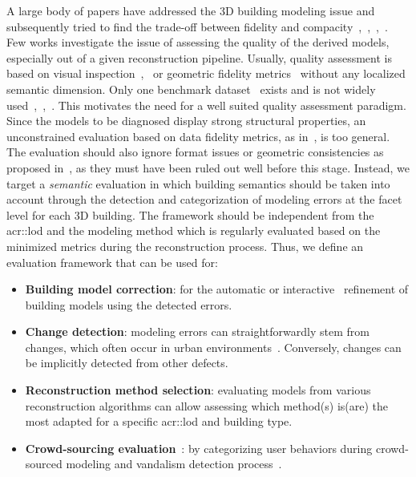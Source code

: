\documentclass[runningheads]{llncs}
\begin{document}
A large body of papers have addressed the 3D building modeling issue and subsequently tried to find the trade-off between fidelity and compacity~\cite{dick2004modelling},~\cite{zebedin2008fusion},~\cite{Lafarge2010},~\cite{verdie2015lod}. Few works investigate the issue of assessing the quality of the derived models, especially out of a given reconstruction pipeline. Usually, quality assessment is based on visual inspection~\cite{Durupt2006},~\cite{MacayMoreia2013} or geometric fidelity metrics~\cite{Kaartinen2005} without any localized semantic dimension. Only one benchmark dataset~\cite{rottensteiner2014results} exists and is not widely used~\cite{li2016boxfitting},~\cite{nan2017polyfit},~\cite{nguatem2017modeling}. This motivates the need for a well suited quality assessment paradigm. Since the models to be diagnosed display strong structural properties, an unconstrained evaluation based on data fidelity metrics, as in~\cite{berger2013benchmark}, is too general. The evaluation should also ignore format issues or geometric consistencies as proposed in~\cite{ledoux2018val3dity}, as they must have been ruled out well before this stage. Instead, we target a \textit{semantic} evaluation in which building semantics should be taken into account through the detection and categorization of modeling errors at the facet level for each 3D building. The framework should be independent from the \acrlong{acr::lod} and the modeling method which is regularly evaluated based on the minimized metrics during the reconstruction process. Thus, we define an evaluation framework that can be used for:
    \begin{itemize}
        \item \textbf{Building model correction}: for the automatic or interactive~\cite{kowdle2011active} refinement of building models using the detected errors.
        \item \textbf{Change detection}: modeling errors can straightforwardly stem from changes, which often occur in urban environments~\cite{taneja2015geometric}. Conversely, changes can be implicitly detected from other defects.
        \item \textbf{Reconstruction method selection}: evaluating models from various reconstruction algorithms can allow assessing which method(s) is(are) the most adapted for a specific \acrshort{acr::lod} and building type.
        \item \textbf{Crowd-sourcing evaluation}~\cite{kovashka2016crowdsourcing}: by categorizing user behaviors during crowd-sourced modeling and vandalism detection process~\cite{neis2012towards}.
    \end{itemize}
\end{document}
